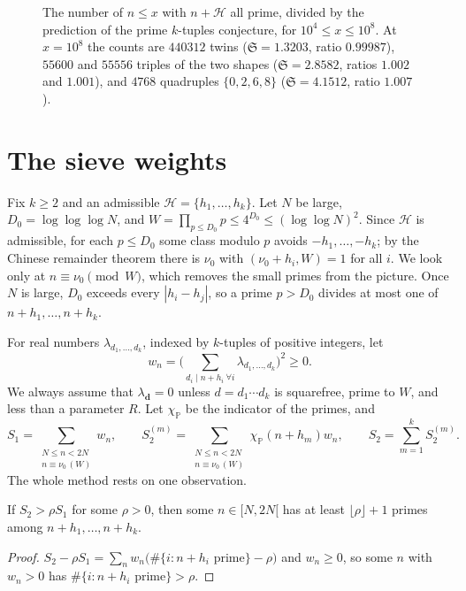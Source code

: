 \begin{figure}[ht]
\centering
{}
\caption{The number of $n\le x$ with $n+\mathcal H$ all prime, divided by the prediction of the prime $k$-tuples conjecture, for $10^4\le x\le10^8$. At $x=10^8$ the counts are $440312$ twins ($\mathfrak S=1.3203$, ratio $0.99987$), $55600$ and $55556$ triples of the two shapes ($\mathfrak S=2.8582$, ratios $1.002$ and $1.001$), and $4768$ quadruples $\{0,2,6,8\}$ ($\mathfrak S=4.1512$, ratio $1.007$).}
\label{fig:tuples}
\end{figure}

\section{The sieve weights}

Fix $k\ge2$ and an admissible $\mathcal H=\{h_1,\dots,h_k\}$. Let $N$ be large, $D_0=\log\log\log N$, and $W=\prod_{p\le D_0}p\le4^{D_0}\le(\log\log N)^2$. Since $\mathcal H$ is admissible, for each $p\le D_0$ some class modulo $p$ avoids $-h_1,\dots,-h_k$; by the Chinese remainder theorem there is $\nu_0$ with $(\nu_0+h_i,W)=1$ for all $i$. We look only at $n\equiv\nu_0\pmod W$, which removes the small primes from the picture. Once $N$ is large, $D_0$ exceeds every $|h_i-h_j|$, so a prime $p>D_0$ divides at most one of $n+h_1,\dots,n+h_k$.

For real numbers $\lambda_{d_1,\dots,d_k}$, indexed by $k$-tuples of positive integers, let
\[
w_n=\Biggl(\sum_{d_i\mid n+h_i\ \forall i}\lambda_{d_1,\dots,d_k}\Biggr)^2\ge0.
\]
We always assume that $\lambda_{\mathbf d}=0$ unless $d=d_1\cdots d_k$ is squarefree, prime to $W$, and less than a parameter $R$. Let $\chi_{\mathbb P}$ be the indicator of the primes, and
\[
S_1=\sum_{\substack{N\le n<2N\\n\equiv\nu_0\,(W)}}w_n,\qquad S_2^{(m)}=\sum_{\substack{N\le n<2N\\n\equiv\nu_0\,(W)}}\chi_{\mathbb P}(n+h_m)w_n,\qquad S_2=\sum_{m=1}^kS_2^{(m)}.
\]
The whole method rests on one observation.

\begin{lemma}\label{lem:gpyprinciple}
If $S_2>\rho S_1$ for some $\rho>0$, then some $n\in[N,2N[$ has at least $\lfloor\rho\rfloor+1$ primes among $n+h_1,\dots,n+h_k$.
\end{lemma}
\begin{proof}
$S_2-\rho S_1=\sum_nw_n\bigl(\#\{i:n+h_i\text{ prime}\}-\rho\bigr)$ and $w_n\ge0$, so some $n$ with $w_n>0$ has $\#\{i:n+h_i\text{ prime}\}>\rho$.
\end{proof}

